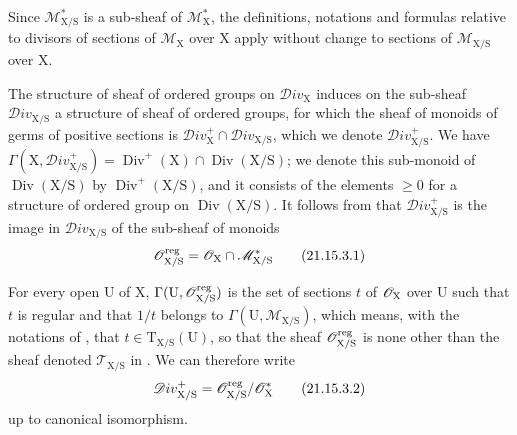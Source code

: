 Since $\mathscr{M}_{\mathrm{X}/\mathrm{S}}^*$ is a sub-sheaf of $\mathscr{M}_{\mathrm{X}}^*$, the definitions, notations and formulas relative to divisors of sections of $\mathscr{M}_{\mathrm{X}}$ over $\mathrm{X}$  apply without change to sections of $\mathscr{M}_{\mathrm{X}/\mathrm{S}}$ over $\mathrm{X}$.

\begin{env}[21.15.3]
\label{IV.21.15.3}
The structure of sheaf of ordered groups on $\mathscr{D}iv_{\mathrm{X}}$  induces on the sub-sheaf $\mathscr{D}iv_{\mathrm{X}/\mathrm{S}}$ a structure of sheaf of ordered groups, for which the sheaf of monoids of germs of positive sections is $\mathscr{D}iv_{\mathrm{X}}^+\cap\mathscr{D}iv_{\mathrm{X}/\mathrm{S}}$, which we denote $\mathscr{D}iv_{\mathrm{X}/\mathrm{S}}^+$.
We have $\Gamma(\mathrm{X},\mathscr{D}iv_{\mathrm{X}/\mathrm{S}}^+)=\operatorname{Div}^+(\mathrm{X})\cap\operatorname{Div}(\mathrm{X}/\mathrm{S})$; we denote this sub-monoid of $\operatorname{Div}(\mathrm{X}/\mathrm{S})$ by $\operatorname{Div}^+(\mathrm{X}/\mathrm{S})$, and it consists of the elements $\geq 0$ for a structure of ordered group on $\operatorname{Div}(\mathrm{X}/\mathrm{S})$.
It follows from  that $\mathscr{D}iv_{\mathrm{X}/\mathrm{S}}^+$ is the image in $\mathscr{D}iv_{\mathrm{X}/\mathrm{S}}$ of the sub-sheaf of monoids
\[
\label{IV.21.15.3.1}
  \mathscr{O}_{\mathrm{X}/\mathrm{S}}^{\operatorname{reg}}=\mathscr{O}_{\mathrm{X}}\cap\mathscr{M}_{\mathrm{X}/\mathrm{S}}^*
  \tag{21.15.3.1}
\]
\end{env}

For every open $\mathrm{U}$ of $\mathrm{X}$, $\Gamma(\mathrm{U},\mathscr{O}_{\mathrm{X}/\mathrm{S}}^{\operatorname{reg}})$ is the set of sections $t$ of $\mathscr{O}_{\mathrm{X}}$ over $\mathrm{U}$ such that $t$ is regular and that $1/t$ belongs to $\Gamma(\mathrm{U},\mathscr{M}_{\mathrm{X}/\mathrm{S}})$, which means, with the notations of , that $t\in\mathrm{T}_{\mathrm{X}/\mathrm{S}}(\mathrm{U})$, so that the sheaf $\mathscr{O}_{\mathrm{X}/\mathrm{S}}^{\operatorname{reg}}$ is none other than the sheaf denoted $\mathscr{T}_{\mathrm{X}/\mathrm{S}}$ in .
We can therefore write
\[
\label{IV.21.15.3.2}
  \mathscr{D}iv_{\mathrm{X}/\mathrm{S}}^+=\mathscr{O}_{\mathrm{X}/\mathrm{S}}^{\operatorname{reg}}/\mathscr{O}_{\mathrm{X}}^*
  \tag{21.15.3.2}
\]
up to canonical isomorphism.

